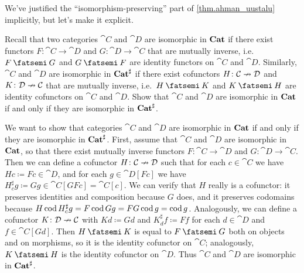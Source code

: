 \documentclass[Book-Poly]{subfiles}
\begin{document}
\begin{exercise}
We've justified the ``isomorphism-preserving'' part of \cref{thm.ahman_uustalu} implicitly, but let's make it explicit.

Recall that two categories $\cat{C}$ and $\cat{D}$ are isomorphic in $\mathbf{Cat}$ if there exist functors $F\colon\cat{C}\to\cat{D}$ and $G\colon\cat{D}\to\cat{C}$ that are mutually inverse, i.e.\ $F\then G$ and $G\then F$ are identity functors on $\cat{C}$ and $\cat{D}$.
Similarly, $\cat{C}$ and $\cat{D}$ are isomorphic in $\mathbf{Cat}^\sharp$ if there exist cofunctors $H\colon\mathcal{C}\nrightarrow\mathcal{D}$ and $K\colon\mathcal{D}\nrightarrow\mathcal{C}$ that are mutually inverse, i.e.\ $H\then K$ and $K\then H$ are identity cofunctors on $\cat{C}$ and $\cat{D}$.
Show that $\cat{C}$ and $\cat{D}$ are isomorphic in $\mathbf{Cat}$ if and only if they are isomorphic in $\mathbf{Cat}^\sharp$.
\begin{solution}
We want to show that categories $\cat{C}$ and $\cat{D}$ are isomorphic in $\mathbf{Cat}$ if and only if they are isomorphic in $\mathbf{Cat}^\sharp$.
First, assume that $\cat{C}$ and $\cat{D}$ are isomorphic in $\mathbf{Cat}$, so that there exist mutually inverse functors $F\colon\cat{C}\to\cat{D}$ and $G\colon\cat{D}\to\cat{C}$.
Then we can define a cofunctor $H\colon\mathcal{C}\nrightarrow\mathcal{D}$ such that for each $c\in\cat{C}$ we have $Hc\coloneqq Fc\in\cat{D}$, and for each $g\in\cat{D}[Fc]$ we have $H^\sharp_c g\coloneqq Gg\in\cat{C}[GFc]=\cat{C}[c]$.
We can verify that $H$ really is a cofunctor: it preserves identities and composition because $G$ does, and it preserves codomains because $H\operatorname{cod} H^\sharp_c g=F\operatorname{cod} Gg=FG\operatorname{cod} g=\operatorname{cod} g$.
Analogously, we can define a cofunctor $K\colon\mathcal{D}\nrightarrow\mathcal{C}$ with $Kd\coloneqq Gd$ and $K^\sharp_d f\coloneqq Ff$ for each $d\in\cat{D}$ and $f\in\cat{C}[Gd]$.
Then $H\then K$ is equal to $F\then G$ both on objects and on morphisms, so it is the identity cofunctor on $\cat{C}$; analogously, $K\then H$ is the identity cofunctor on $\cat{D}$.
Thus $\cat{C}$ and $\cat{D}$ are isomorphic in $\mathbf{Cat}^\sharp$.


\end{solution}
\end{exercise}
\end{document}
